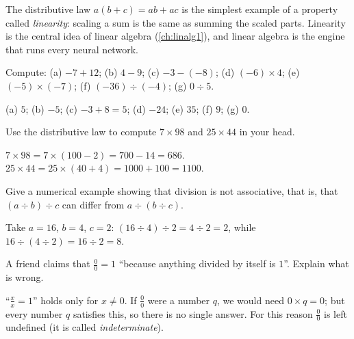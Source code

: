 \begin{mlnote}[Linearity]
The distributive law $a(b + c) = ab + ac$ is the simplest example of a property
called \emph{linearity}: scaling a sum is the same as summing the scaled parts.
Linearity is the central idea of linear algebra (\cref{ch:linalg1}), and
linear algebra is the engine that runs every neural network.
\end{mlnote}

\sectionexercises

\begin{exercise}
Compute: (a) $-7 + 12$; (b) $4 - 9$; (c) $-3 - (-8)$; (d) $(-6) \times 4$;
(e) $(-5)\times(-7)$; (f) $(-36) \div (-4)$; (g) $0 \div 5$.
\end{exercise}
\begin{solution}
(a) $5$; (b) $-5$; (c) $-3 + 8 = 5$; (d) $-24$; (e) $35$; (f) $9$; (g) $0$.
\end{solution}

\begin{exercise}
Use the distributive law to compute $7 \times 98$ and $25 \times 44$ in your
head.
\end{exercise}
\begin{solution}
$7 \times 98 = 7 \times (100 - 2) = 700 - 14 = 686$.
$25 \times 44 = 25 \times (40 + 4) = 1000 + 100 = 1100$.
\end{solution}

\begin{exercise}
Give a numerical example showing that division is not associative, that is,
that $(a \div b) \div c$ can differ from $a \div (b \div c)$.
\end{exercise}
\begin{solution}
Take $a = 16$, $b = 4$, $c = 2$: $(16 \div 4) \div 2 = 4 \div 2 = 2$, while
$16 \div (4 \div 2) = 16 \div 2 = 8$.
\end{solution}

\begin{exercise}
A friend claims that $\tfrac{0}{0} = 1$ ``because anything divided by itself is
$1$''. Explain what is wrong.
\end{exercise}
\begin{solution}
``$\tfrac{x}{x} = 1$'' holds only for $x \neq 0$. If $\tfrac00$ were a number
$q$, we would need $0 \times q = 0$; but every number $q$ satisfies this, so
there is no single answer. For this reason $\tfrac00$ is left undefined (it is
called \emph{indeterminate}).
\end{solution}

